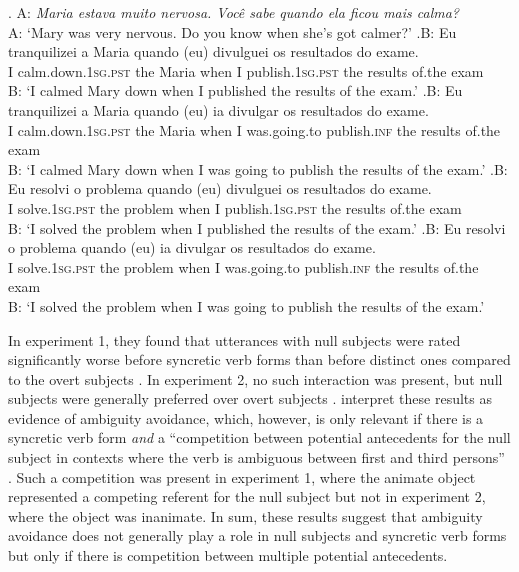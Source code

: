 \ex.\label{ex:soares.item}
A: \textit{Maria estava muito nervosa. Você sabe quando ela ficou mais calma?}\\
A: `Mary was very nervous. Do you know when she’s got calmer?'
\ag.\label{ex:soares.item.1}B: Eu tranquilizei a Maria quando (eu) divulguei os resultados do exame.\\
{} I calm.down.\textsc{1sg.pst}  the Maria when I publish.\textsc{1sg.pst} the results of.the exam\\
B: `I calmed Mary down when I published the results of the exam.' \citep[3588]{soares.etal2019}
\bg.\label{ex:soares.item.2}B: Eu tranquilizei a Maria quando (eu) ia divulgar os resultados do exame.\\
{} I calm.down.\textsc{1sg.pst} the Maria when I was.going.to publish.\textsc{inf} the results of.the exam\\
B: `I calmed Mary down when I was going to publish the results of the exam.' \citep[3588]{soares.etal2019}
\cg.\label{ex:soares.item.3}B: Eu resolvi o problema quando (eu) divulguei os resultados do exame.\\
{} I solve.\textsc{1sg.pst} the problem when I publish.\textsc{1sg.pst} the results of.the exam\\
B: `I solved the problem when I published the results of the exam.' \citep[3592]{soares.etal2019}
\dg.\label{ex:soares.item.4}B: Eu resolvi o problema quando (eu) ia divulgar os resultados do exame.\\
{} I solve.\textsc{1sg.pst} the problem when I was.going.to publish.\textsc{inf} the results of.the exam\\
B: `I solved the problem when I was going to publish the results of the exam.' \citep[3592]{soares.etal2019}

In experiment 1, they found that utterances with null subjects were rated significantly worse before syncretic verb forms than before distinct ones compared to the overt subjects \citep[3591]{soares.etal2019}.
In experiment 2, no such interaction was present, but null subjects were generally preferred over overt subjects \citep[3593]{soares.etal2019}.
\citet[3593]{soares.etal2019} interpret these results as evidence of ambiguity avoidance, which, however, is only relevant if there is a syncretic verb form \textit{and} a ``competition between potential antecedents  for the null subject in contexts where the verb is ambiguous between first and third persons'' \citep[3593]{soares.etal2019}.
Such a competition was present in experiment 1, where the animate  object represented a competing referent for the null subject but not in experiment 2, where the object was inanimate.
In sum, these results suggest that ambiguity avoidance does not generally play a role in null subjects and syncretic verb forms but only if there is competition between multiple potential antecedents. 

